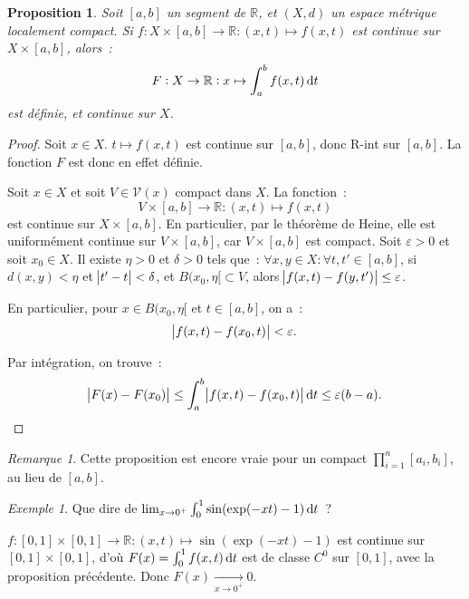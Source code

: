 \documentclass{report}
\newtheorem{prp}[thm]{Proposition}
\theoremstyle{definition}
\theoremstyle{remark}
\newtheorem*{rmq}{Remarque}
\newtheorem{ex}{Exemple}[chapter]
\numberwithin{equation}{section}
\newcommand{\R}{\mathbb R}
\begin{document}
			\begin{prp}\label{prp:intparamcontinuesidefsurcpct} Soit $[a, b]$ un segment de $\R$, et $(X, d)$ un espace métrique localement compact.
			Si $f : X \times [a, b] \to \R : (x, t) \mapsto f(x, t)$ est continue sur $X \times [a, b]$, alors~:
			\begin{equation}
				F : X \to \R : x \mapsto \int_a^bf(x, t)\dif t
			\end{equation}
			est définie, et continue sur $X$.
			\end{prp}

			\begin{proof} Soit $x \in X$. $t \mapsto f(x, t)$ est continue sur $[a, b]$, donc R-int sur $[a, b]$. La fonction $F$ est donc en effet définie.

			Soit $x \in X$ et soit $V \in \mathcal V(x)$ compact dans $X$. La fonction~:
			\begin{equation}
				V \times [a, b] \to \R : (x, t) \mapsto f(x, t)
			\end{equation}
			est continue sur $X \times [a, b]$. En particulier, par le théorème de Heine, elle est uniformément continue sur $V \times [a, b]$, car $V \times [a, b]$
			est compact. Soit $\varepsilon > 0$ et soit $x_0 \in X$. Il existe $\eta > 0$ et $\delta > 0$ tels que~: $\forall x, y \in X : \forall t, t' \in [a, b]$,
			si $d(x, y) < \eta$ et $\abs {t'-t} < \delta$, et $B(x_0, \eta[ \subset V$, alors $\abs {f(x, t) - f(y, t')} \leq \varepsilon$.

			En particulier, pour $x \in B(x_0, \eta[$ et $t \in [a, b]$, on a~:
			\begin{equation}
				\abs {f(x, t) - f(x_0, t)} < \varepsilon.
			\end{equation}

			Par intégration, on trouve~:
			\begin{equation}
				\abs {F(x) - F(x_0)} \leq \int_a^b\abs {f(x, t) - f(x_0, t)}\dif t \leq \varepsilon (b-a).
			\end{equation}
			\end{proof}

			\begin{rmq} Cette proposition est encore vraie pour un compact $\prod_{i=1}^n[a_i, b_i]$, au lieu de $[a, b]$.
			\end{rmq}

			\begin{ex} Que dire de $\lim_{x \to 0^+} \int_0^1\sin(\exp(-xt) - 1)\dif t$~?

			$f : [0, 1] \times [0, 1]  \to \R : (x, t) \mapsto \sin(\exp(-xt) - 1)$ est continue sur $[0, 1] \times [0, 1]$, d'où $F(x) = \int_0^1f(x, t)\dif t$
			est de classe $C^0$ sur $[0, 1]$, avec la proposition précédente. Donc $F(x) \xrightarrow[x \to 0^+]{} 0$.
			\end{ex}
\end{document}
